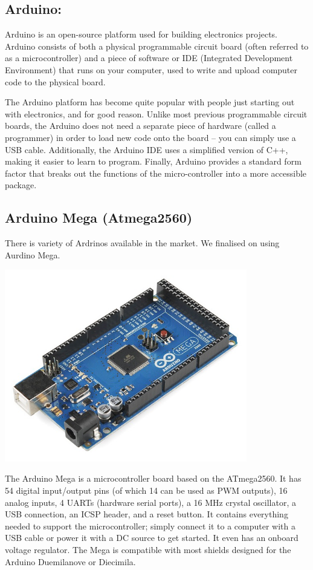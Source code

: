 \documentclass[a4paper,12pt]{article}
\begin{document}
\subsection{Arduino:}
Arduino is an open-source platform used for building electronics projects. Arduino consists of both a physical programmable 
circuit board (often referred to as a microcontroller) and a piece of software or IDE (Integrated Development Environment) that 
runs on your computer, used to write and upload computer code to the physical board.

The Arduino platform has become quite popular with people just starting out with electronics, and for good reason. 
Unlike most previous programmable circuit boards, the Arduino does not need a separate piece of hardware (called a programmer) 
in order to load new code onto the board – you can simply use a USB cable. Additionally, the Arduino IDE uses a simplified version
of C++, making it easier to learn to program. Finally, Arduino provides a standard form factor that breaks out the functions of the 
micro-controller into a more accessible package.

\subsection{Arduino Mega (Atmega2560)}
There is variety of Ardrinos available in the market. We finalised on using
Aurdino Mega.

\graphicspath{ {images/} }
\includegraphics[width=300pt]{arduino}

The Arduino Mega is a microcontroller board based on the ATmega2560. It has 54 digital input/output pins (of which 14
can be used as PWM outputs), 16 analog inputs, 4 UARTs (hardware serial ports), a
16 MHz crystal oscillator, a USB connection, an ICSP header, and a
reset button. It contains everything needed to support the microcontroller;
simply connect it to a computer with a USB cable or power it with a DC source to get started. It even has an onboard voltage regulator.
The Mega is compatible with most shields designed for the Arduino Duemilanove or Diecimila.
\end{document}
